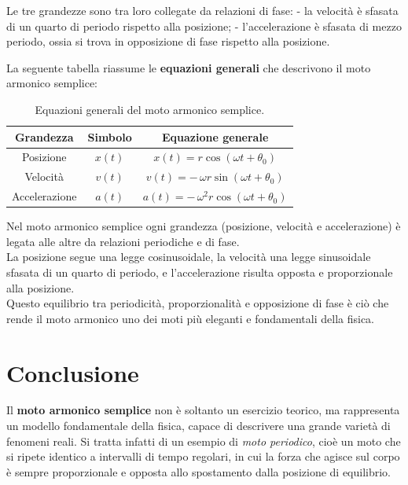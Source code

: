 \documentclass[a4paper,12pt]{article}
\begin{document}
Le tre grandezze sono tra loro collegate da relazioni di fase:  
- la velocità è sfasata di un quarto di periodo rispetto alla posizione;  
- l’accelerazione è sfasata di mezzo periodo, ossia si trova in opposizione di fase rispetto alla posizione.

\bigskip
\noindent
La seguente tabella riassume le \textbf{equazioni generali} che descrivono il moto armonico semplice:

\begin{table}[H]
\centering
\renewcommand{\arraystretch}{1.5}
\begin{tabular}{|c|c|c|}
\hline
\textbf{Grandezza} & \textbf{Simbolo} & \textbf{Equazione generale} \\
\hline
Posizione & $x(t)$ & $x(t) = r \cos(\omega t + \theta_0)$ \\
\hline
Velocità & $v(t)$ & $v(t) = -\,\omega r \sin(\omega t + \theta_0)$ \\
\hline
Accelerazione & $a(t)$ & $a(t) = -\,\omega^2 r \cos(\omega t + \theta_0)$ \\
\hline
\end{tabular}
\caption{Equazioni generali del moto armonico semplice.}
\label{tab:motoarmonico_equazioni}
\end{table}

\bigskip
\noindent
Nel moto armonico semplice ogni grandezza (posizione, velocità e accelerazione) è legata alle altre da relazioni periodiche e di fase.  
\\La posizione segue una legge cosinusoidale, la velocità una legge sinusoidale sfasata di un quarto di periodo, e l’accelerazione risulta opposta e proporzionale alla posizione.  
\\Questo equilibrio tra periodicità, proporzionalità e opposizione di fase è ciò che rende il moto armonico uno dei moti più eleganti e fondamentali della fisica.

\newpage
\section{Conclusione}
Il \textbf{moto armonico semplice} non è soltanto un esercizio teorico, ma rappresenta un modello fondamentale della fisica, capace di descrivere una grande varietà di fenomeni reali.  
Si tratta infatti di un esempio di \emph{moto periodico}, cioè un moto che si ripete identico a intervalli di tempo regolari, in cui la forza che agisce sul corpo è sempre proporzionale e opposta allo spostamento dalla posizione di equilibrio.
\end{document}
